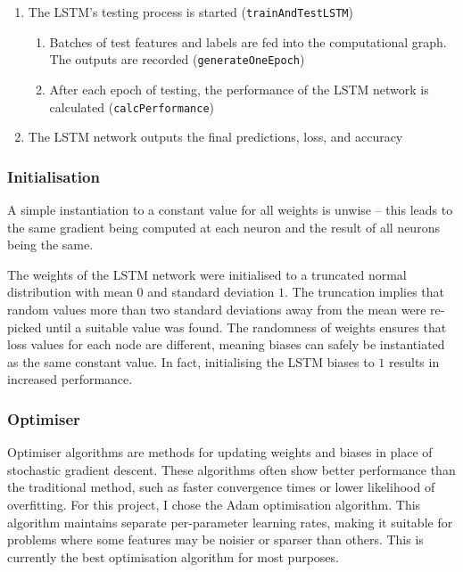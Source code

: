 \documentclass[12pt,a4paper,twoside,openright]{report}
\begin{document}
\begin{enumerate}
\item
The LSTM's testing process is started (\texttt{trainAndTestLSTM})
\begin{enumerate}
	\item
	Batches of test features and labels are fed into the computational graph.
	The outputs are recorded (\texttt{generateOneEpoch})

	\item
	After each epoch of testing, the performance of the LSTM network is calculated (\texttt{calcPerformance})
\end{enumerate}

\item
The LSTM network outputs the final predictions, loss, and accuracy
\end{enumerate}


\subsubsection{Initialisation}
A simple instantiation to a constant value for all weights is unwise --
this leads to the same gradient being computed at each neuron and the result of all
neurons being the same.

The weights of the LSTM network were initialised to a truncated
normal distribution with mean $0$ and standard deviation $1$. The truncation
implies that random values more than two standard deviations
away from the mean were re-picked until a suitable value was found. 
The randomness of weights ensures that loss values for each node
are different, meaning biases can safely be instantiated as the same
constant value. In fact, initialising the LSTM biases to $1$
results in increased performance\cite{Jozefowicz15}.

\subsubsection{Optimiser}
\label{sec:implLSTMOpt}
Optimiser algorithms are methods for updating weights and biases
in place of stochastic gradient descent. These
algorithms often show better performance than the traditional
method, such as faster convergence times or lower likelihood of overfitting.
For this project, I chose the Adam optimisation algorithm\cite{Kingma14}.
This algorithm maintains separate per-parameter learning rates, making it suitable
for problems where some features may be noisier or sparser than others. This
is currently the best optimisation algorithm for most purposes\cite{KarpathyCS231n}.
\end{document}
